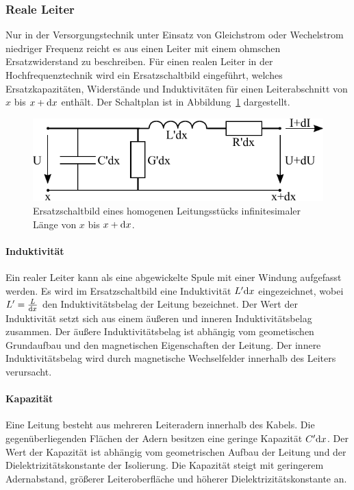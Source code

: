 \documentclass[a4paper,twoside,final]{article}
\begin{document}
\subsubsection{Reale Leiter}
Nur in der Versorgungstechnik unter Einsatz von Gleichstrom oder Wechelstrom niedriger Frequenz reicht es aus einen Leiter mit einem ohmschen Ersatzwiderstand zu beschreiben. Für einen realen Leiter in der Hochfrequenztechnik wird ein Ersatzschaltbild eingeführt, welches Ersatzkapazitäten, Widerstände und Induktivitäten für einen Leiterabschnitt von $x$ bis $x+\mathrm{d} x$ enthält. Der Schaltplan ist in Abbildung~\ref{fig:Ersatzschaltbild} dargestellt.
\begin{figure}[htp]
    \centering
    \includegraphics{Schaltungen/Ersatzschaltbild.pdf}
    \caption{Ersatzschaltbild eines homogenen Leitungsstücks infinitesimaler Länge von $x$ bis $x+\mathrm{d} x$.}
    \label{fig:Ersatzschaltbild}
\end{figure}
\paragraph{Induktivität} Ein realer Leiter kann als eine abgewickelte Spule mit einer Windung aufgefasst werden. Es wird im Ersatzschaltbild eine Induktivität $L'\mathrm{d} x$ eingezeichnet, wobei $L' = \frac{L}{\mathrm{d} x}$ den Induktivitätsbelag der Leitung bezeichnet. Der Wert der Induktivität setzt sich aus einem äußeren und inneren Induktivitätsbelag zusammen. Der äußere Induktivitätsbelag ist abhängig vom geometischen Grundaufbau und den magnetischen Eigenschaften der Leitung. Der innere Induktivitätsbelag wird durch magnetische Wechselfelder innerhalb des Leiters verursacht.
\paragraph{Kapazität} Eine Leitung besteht aus mehreren Leiteradern innerhalb des Kabels. Die gegenüberliegenden Flächen der Adern besitzen eine geringe Kapazität $C'\mathrm{d} x$. Der Wert der Kapazität ist abhängig vom geometrischen Aufbau der Leitung und der Dielektrizitätskonstante der Isolierung. Die Kapazität steigt mit geringerem Adernabstand, größerer Leiteroberfläche und höherer Dielektrizitätskonstante an.
\end{document}
